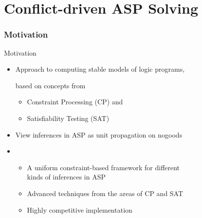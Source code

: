 \part{Conflict-driven ASP Solving}
\newcommand{\clno}[1]{\ensuremath{\delta(#1)}}
\newcommand{\ClNo}[1]{\ensuremath{\Delta(#1)}}
\newcommand{\nocl}[1]{\ensuremath{\gamma(#1)}}
\newcommand{\NoCl}[1]{\ensuremath{\Gamma(#1)}}
\newcommand{\sigmaAUX}{\rho}%
\section{Motivation}
\begin{frame}{Motivation}
  \begin{itemize}
  \item<1-> Approach to computing stable models of logic programs,

    based on concepts from
    \begin{itemize}
    \item Constraint Processing (CP) and
    \item Satisfiability Testing (SAT)
    \end{itemize}

  \item<1-> View inferences in ASP as unit propagation on nogoods

  \item<1-> \
    \begin{itemize}
    \item A uniform constraint-based framework for different\\ kinds of
      inferences in ASP
    \item Advanced techniques from the areas of CP and SAT
    \item Highly competitive implementation
    \end{itemize}
  \end{itemize}
\end{frame}
